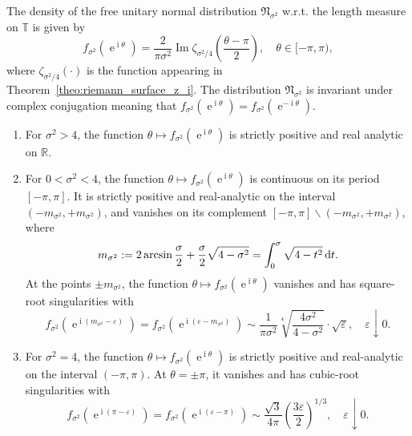 \documentclass[AHL,Unicode,longabstracts,published]{cedram}
\DeclareMathOperator{\Imm}{Im}
\DeclareMathOperator{\eee}{e}
\DeclareMathOperator{\ii}{i}
\newcommand{\fnorm}{\mathfrak{N}}
\newcommand{\bT}{\mathbb{T}}
\newcommand{\R}{\mathbb{R}}
\newcommand*\dint{\text{\normalfont d}}
\newcommand{\eps}{\varepsilon}
\newcommand*{\relabel}{\renewcommand{\labelenumi}{(\theenumi)}}
\newcommand*{\alphenumi}{\renewcommand*{\theenumi}{\alph{enumi}}\relabel}
\begin{document}
\begin{theo}\label{theo:properties_free_normal}
The density of the free unitary normal distribution $\fnorm_{\sigma^2}$ w.r.t. the length measure on $\bT$ is given by
\begin{equation}\label{eq:density_free_normal_zeta}
f_{\sigma^2}(\eee^{\ii \theta}) = \frac {2}{\pi \sigma^2} \Imm \zeta_{\sigma^2/4}\left(\frac{\theta - \pi}{2}\right),
\quad
\theta\in [-\pi, \pi),
\end{equation}
where $\zeta_{\sigma^2/4}(\cdot)$ is the function appearing in Theorem~\ref{theo:riemann_surface_z_i}. The distribution $\fnorm_{\sigma^2}$ is invariant under complex conjugation meaning that $f_{\sigma^2}(\eee^{\ii \theta}) = f_{\sigma^2}(\eee^{-\ii \theta})$.
\begin{enumerate}\alphenumi
\item For $\sigma^2>4$, the function $\theta \mapsto f_{\sigma^2}(\eee^{\ii \theta})$ is strictly positive and real analytic on $\R$.
\item For $0<\sigma^2<4$, the function $\theta \mapsto f_{\sigma^2}(\eee^{\ii \theta})$ is continuous on its period $[-\pi,\pi]$. It is strictly positive and real-analytic on the interval $(-m_{\sigma^2}, +m_{\sigma^2})$, and vanishes on its complement $[-\pi,\pi]\backslash (-m_{\sigma^2}, +m_{\sigma^2})$, where
\begin{equation}\label{eq:support_free_normal}
m_{\sigma^2} := 2 \arcsin \frac \sigma 2 + \frac \sigma 2 \sqrt{4- \sigma^2}= \int_0^{\sigma}\sqrt{4-t^2}\, \dint t.
\end{equation}
At the points $\pm m_{\sigma^2}$, the function $\theta \mapsto f_{\sigma^2}(\eee^{\ii \theta})$ vanishes and has square-root singularities with
\begin{equation}\label{eq:square_root_sing}
f_{\sigma^2}\left(\eee^{\ii \left(m_{\sigma^2} - \eps\right)}\right) = f_{\sigma^2}\left(\eee^{\ii \left(\eps - m_{\sigma^2}\right)}\right)
\sim
\frac {1}{\pi \sigma^2} \sqrt[4]{\frac{4\sigma^2}{4 - \sigma^2}} \cdot \sqrt \eps,
\quad
\eps\downarrow 0.
\end{equation}
\item For $\sigma^2 = 4$, the function $\theta \mapsto f_{\sigma^2}(\eee^{\ii \theta})$ is strictly positive and real-analytic on the interval $(-\pi, \pi)$. At $\theta = \pm \pi$, it vanishes and has cubic-root singularities with
\begin{equation}\label{eq:critical_cubic_root_sing}
f_{\sigma^2}\left(\eee^{\ii (\pi -\eps)}\right) = f_{\sigma^2}\left(\eee^{\ii (\eps - \pi)}\right) \sim \frac{\sqrt 3}{4\pi} \left(\frac{3\eps}{2}\right)^{1/3},
\quad
\eps\downarrow 0.
\end{equation}
\end{enumerate}
\end{theo}
\end{document}
